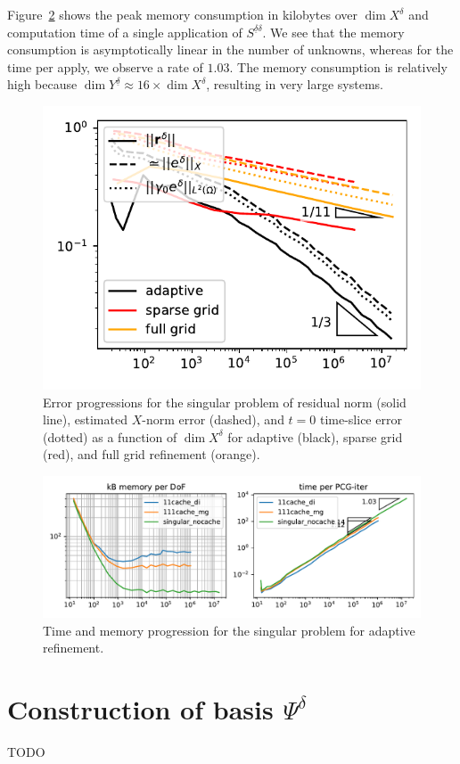 \documentclass[11pt,a4paper,oneside,english]{amsart}
\numberwithin{equation}{section}
\numberwithin{theorem}{section}
\theoremstyle{definition}
\newcommand{\udelta}{{\underline{\delta}}}
\newcommand{\jw}[1]{{\color{red}{JW: #1}}}
\begin{document}
Figure~\ref{fig:singular-time-memory} shows the peak memory consumption in kilobytes
over $\dim X^\delta$ and computation time of a single application of $S^{\udelta \delta}$.
We see that the memory consumption is asymptotically linear in the number of
unknowns, whereas for the time per apply, we observe a rate of $1.03$.\jw{dit is natuurlijk groter dan 1. Is het wel acceptabel?}
The memory consumption is relatively high because $\dim Y^\udelta \approx 16 \times \dim X^\delta$,
resulting in very large systems.\jw{oef, ja wel goed om te vertellen maar 16 is een hoge constante zeg}

\begin{figure}
  \includegraphics[width=0.5\linewidth]{singular_adaptive_errors}
  \caption{Error progressions for the singular problem of residual norm (solid line),
  estimated $X$-norm error (dashed), and $t=0$ time-slice error (dotted) as a function
  of $\dim X^\delta$ for adaptive (black), sparse grid (red), and full grid refinement (orange).}
  \label{fig:singular-error}
\end{figure}
\begin{figure}
  \includegraphics[width=\linewidth]{singular_mem_time.pdf}
  \caption{Time and memory progression for the singular problem for adaptive refinement.\jw{excuse the terrible graph}}
  \label{fig:singular-time-memory}
\end{figure}

\appendix
\section{Construction of basis $\Psi^\delta$}
\label{sec:PsiDelta}
TODO




\end{document}
